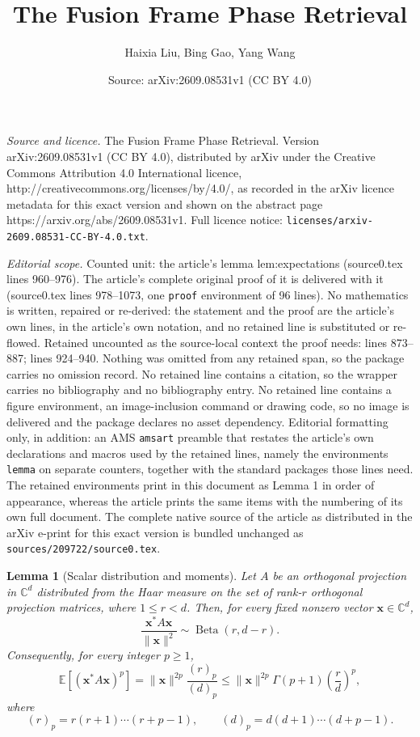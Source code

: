 \documentclass[10pt,a4paper]{amsart}
\title{The Fusion Frame Phase Retrieval}
\author{Haixia Liu, Bing Gao, Yang Wang}
\date{Source: arXiv:2609.08531v1 (CC BY 4.0)}
\newtheorem{lemma}{Lemma}
\newcommand{\C}{{\mathbb C}}
\newcommand{\E}{{\mathbb E}}
\newcommand{\vx}{{\mathbf x}}
\begin{document}
\maketitle

\noindent\emph{Source and licence.} The Fusion Frame Phase Retrieval. Version arXiv:2609.08531v1 (CC BY 4.0), distributed by arXiv under the Creative Commons Attribution 4.0 International licence, http://creativecommons.org/licenses/by/4.0/, as recorded in the arXiv licence metadata for this exact version and shown on the abstract page https://arxiv.org/abs/2609.08531v1. Full licence notice: \texttt{licenses/arxiv-2609.08531-CC-BY-4.0.txt}.\par\smallskip

\noindent\textit{Editorial scope.} Counted unit: the article's lemma lem:expectations (source0.tex lines 960--976). The article's complete original proof of it is delivered with it (source0.tex lines 978--1073, one \texttt{proof} environment of 96 lines). No mathematics is written, repaired or re-derived: the statement and the proof are the article's own lines, in the article's own notation, and no retained line is substituted or re-flowed.  Retained uncounted as the source-local context the proof needs: lines 873--887; lines 924--940.  Nothing was omitted from any retained span, so the package carries no omission record.  No retained line contains a citation, so the wrapper carries no bibliography and no bibliography entry.  No retained line contains a figure environment, an image-inclusion command or drawing code, so no image is delivered and the package declares no asset dependency.  Editorial formatting only, in addition: an AMS \texttt{amsart} preamble that restates the article's own declarations and macros used by the retained lines, namely the environments \texttt{lemma} on separate counters, together with the standard packages those lines need.  The retained environments print in this document as Lemma 1 in order of appearance, whereas the article prints the same items with the numbering of its own full document.  The complete native source of the article as distributed in the arXiv e-print for this exact version is bundled unchanged as \texttt{sources/209722/source0.tex}.
	\begin{lemma}[Scalar distribution and moments]
		\label{lem:beta-d}
		Let $A$ be an orthogonal projection in $\C^d$ distributed from the Haar measure on the set of rank-$r$ orthogonal projection matrices, where $1\le r<d$. Then, for every fixed nonzero vector $\vx\in\C^d$,
		\[
		\frac{\vx^*A\vx}{\|\vx\|^2}\sim\operatorname{Beta}(r,d-r).
		\]
		Consequently, for every integer $p\ge 1$,
		\[
		\E\left[(\vx^*A\vx)^p\right]=\|\vx\|^{2p}\frac{(r)_p}{(d)_p}\leq\|\vx\|^{2p}\Gamma(p+1)\left(\frac{r}{d}\right)^p,
		\]
		where
		\[
		(r)_p=r(r+1)\cdots(r+p-1),\qquad (d)_p=d(d+1)\cdots(d+p-1).
		\]
	\end{lemma}
\end{document}
